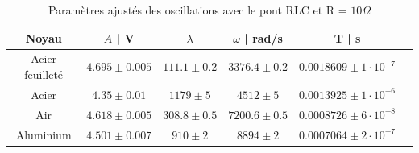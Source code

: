 \documentclass[preview]{standalone}
\begin{document}
\begin{table}[h!]
 \centering
 \label{tab:fits}
 \renewcommand{\arraystretch}{1.2}
 \begin{tabular}{|c|c|c|c|c|c|}
 \hline
 Noyau & $A$ | V & $\lambda$ & $\omega$ | rad/s & T | s \\
 \hline
 Acier feuilleté     &
 $4.695 \pm 0.005$ &
 $111.1 \pm 0.2$ &
 $3376.4 \pm 0.2$ &
 $0.0018609 \pm 1 \cdot 10^{-7}$ \\

 Acier     &
 $4.35 \pm 0.01$ &
 $1179 \pm 5$ &
$4512 \pm 5$ &
 $0.0013925 \pm 1 \cdot 10^{-6}$ \\

 Air     &
 $4.618 \pm 0.005$ &
 $308.8 \pm 0.5$ &
 $7200.6 \pm 0.5$ &
 $0.0008726 \pm 6 \cdot 10^{-8}$ \\

 Aluminium     &
 $4.501 \pm 0.007$ &
 $910 \pm 2$ &
 $8894 \pm 2$ &
 $0.0007064 \pm 2 \cdot 10^{-7}$ \\
 \hline
 \end{tabular}
 \caption{Paramètres ajustés des oscillations avec le pont RLC et R = $10 \Omega$}
 \end{table}
\end{document}
